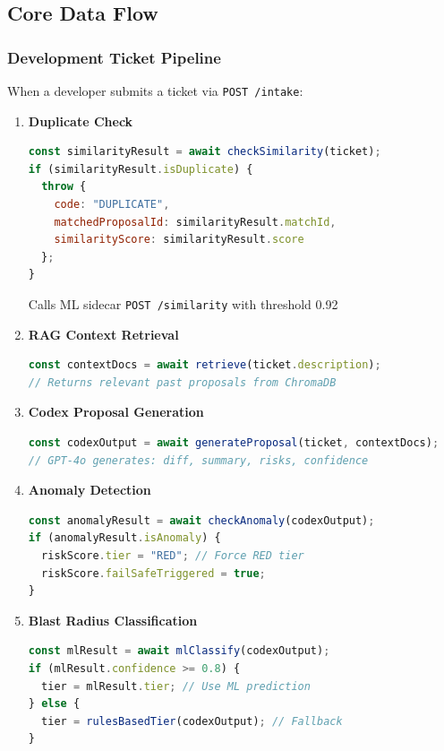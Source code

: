 \documentclass[11pt,a4paper]{article}
\begin{document}
\subsection{Core Data Flow}

\subsubsection{Development Ticket Pipeline}
When a developer submits a ticket via \texttt{POST /intake}:

\begin{enumerate}[leftmargin=*]
    \item \textbf{Duplicate Check}
    \begin{lstlisting}[language=JavaScript,caption=Similarity Check (intake.ts)]
const similarityResult = await checkSimilarity(ticket);
if (similarityResult.isDuplicate) {
  throw { 
    code: "DUPLICATE", 
    matchedProposalId: similarityResult.matchId,
    similarityScore: similarityResult.score 
  };
}
    \end{lstlisting}
    Calls ML sidecar \texttt{POST /similarity} with threshold 0.92
    
    \item \textbf{RAG Context Retrieval}
    \begin{lstlisting}[language=JavaScript,caption=RAG Agent (rag.ts)]
const contextDocs = await retrieve(ticket.description);
// Returns relevant past proposals from ChromaDB
    \end{lstlisting}
    
    \item \textbf{Codex Proposal Generation}
    \begin{lstlisting}[language=JavaScript,caption=Codex Agent]
const codexOutput = await generateProposal(ticket, contextDocs);
// GPT-4o generates: diff, summary, risks, confidence
    \end{lstlisting}
    
    \item \textbf{Anomaly Detection}
    \begin{lstlisting}[language=JavaScript,caption=Anomaly Check (riskEngine.ts)]
const anomalyResult = await checkAnomaly(codexOutput);
if (anomalyResult.isAnomaly) {
  riskScore.tier = "RED"; // Force RED tier
  riskScore.failSafeTriggered = true;
}
    \end{lstlisting}
    
    \item \textbf{Blast Radius Classification}
    \begin{lstlisting}[language=JavaScript,caption=ML Classifier]
const mlResult = await mlClassify(codexOutput);
if (mlResult.confidence >= 0.8) {
  tier = mlResult.tier; // Use ML prediction
} else {
  tier = rulesBasedTier(codexOutput); // Fallback
}
    \end{lstlisting}


\end{enumerate}
\end{document}
